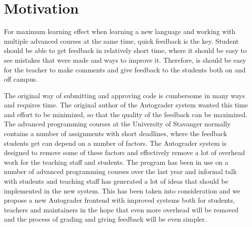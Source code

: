 \chapter{Motivation}
For maximum learning effect when learning a new language and working with multiple advanced courses at the same time, quick feedback is the key. Student should be able to get feedback in relatively short time, where it should be easy to see mistakes that were made and ways to improve it. Therefore, is should be easy for the teacher to make comments and give feedback to the students both on and off campus.

The original way of submitting and approving code is cumbersome in many ways and requires time. The original author of the Autograder system wanted this time and effort to be minimized, so that the quality of the feedback can be maximized. The advanced programming courses at the University of Stavanger normally contains a number of assignments with short deadlines, where the feedback students get can depend on a number of factors. The Autograder system is designed to remove some of these factors and effectively remove a lot of overhead work for the teaching staff and students. The program has been in use on a number of advanced programming courses over the last year and informal talk with students and teaching staff has generated a lot of ideas that should be implemented in the new system. This has been taken into consideration and we propose a new Autograder frontend with improved systems both for students, teachers and maintainers in the hope that even more overhead will be removed and the process of grading and giving feedback will be even simpler.




%
